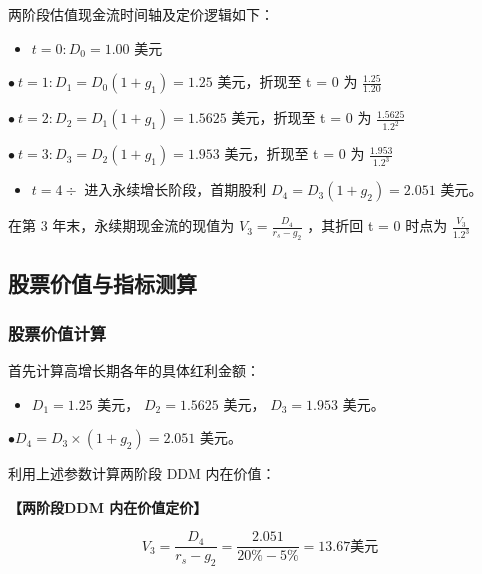 \documentclass[lang=cn,10pt,color=blue]{elegantbook}
\begin{document}
两阶段估值现金流时间轴及定价逻辑如下： 

\begin{itemize}
  \item $t = 0 \colon D _ { 0 } = 1 . 0 0$ 美元
\end{itemize}

$\bullet \ t = 1 : D _ { 1 } = D _ { 0 } ( 1 + g _ { 1 } ) = 1 . 2 5$ 美元，折现至 t = 0 为 $\frac{1.25}{1.20}$

$\bullet \ t = 2 \colon D _ { 2 } = D _ { 1 } ( 1 + g _ { 1 } ) = 1 . 5 6 2 5$ 美元，折现至 t = 0 为 $\textstyle { \frac { 1 . 5 6 2 5 } { 1 . 2 ^ { 2 } } }$ 

$\bullet \ t = 3 : D _ { 3 } = D _ { 2 } ( 1 + g _ { 1 } ) = 1 . 9 5 3$ 美元，折现至 t = 0 为 $\frac { 1 . 9 5 3 } { 1 . 2 ^ { 3 } }$ 

\begin{itemize}
  \item $t = 4 \div$ 进入永续增长阶段，首期股利 $D _ { 4 } = D _ { 3 } ( 1 + g _ { 2 } ) = 2 . 0 5 1$ 美元。
\end{itemize}

在第 3 年末，永续期现金流的现值为 $\displaystyle V _ { 3 } = \frac { D _ { 4 } } { r _ { s } - g _ { 2 } }$ ，其折回 t = 0 时点为 $\frac { V _ { 3 } } { 1 . 2 ^ { 3 } }$ 

\subsection{股票价值与指标测算}

\subsubsection{股票价值计算}

首先计算高增长期各年的具体红利金额： 

\begin{itemize}
  \item $D _ { 1 } = 1 . 2 5$ 美元， $D _ { 2 } = 1 . 5 6 2 5$ 美元， $D _ { 3 } = 1 . 9 5 3$ 美元。
\end{itemize}

$\bullet D _ { 4 } = D _ { 3 } \times ( 1 + g _ { 2 } ) = 2 . 0 5 1$ 美元。 

利用上述参数计算两阶段 DDM 内在价值： 

\textbf{\color{UnivColor} 【两阶段DDM 内在价值定价】} 

$$
V _ {3} = \frac {D _ {4}}{r _ {s} - g _ {2}} = \frac {2 . 0 5 1}{20 \% - 5 \%} = 1 3. 6 7 \text{美元}
$$
\end{document}
